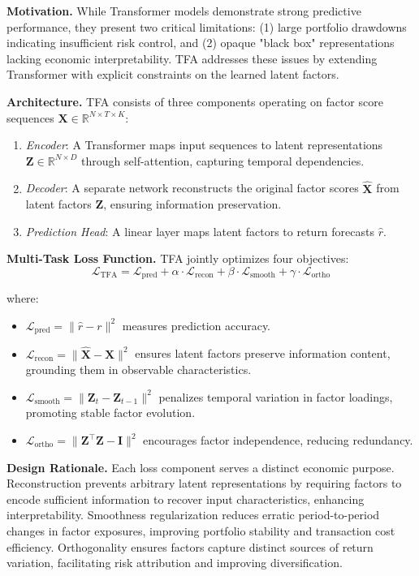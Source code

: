 \documentclass[12pt]{article}
\begin{document}
\textbf{Motivation.} While Transformer models demonstrate strong predictive performance, they present two critical limitations: (1) large portfolio drawdowns indicating insufficient risk control, and (2) opaque "black box" representations lacking economic interpretability. TFA addresses these issues by extending Transformer with explicit constraints on the learned latent factors.

\textbf{Architecture.} TFA consists of three components operating on factor score sequences $\mathbf{X} \in \mathbb{R}^{N \times T \times K}$:
\begin{enumerate}
    \item \textit{Encoder}: A Transformer maps input sequences to latent representations $\mathbf{Z} \in \mathbb{R}^{N \times D}$ through self-attention, capturing temporal dependencies.
    \item \textit{Decoder}: A separate network reconstructs the original factor scores $\hat{\mathbf{X}}$ from latent factors $\mathbf{Z}$, ensuring information preservation.
    \item \textit{Prediction Head}: A linear layer maps latent factors to return forecasts $\hat{r}$.
\end{enumerate}

\textbf{Multi-Task Loss Function.} TFA jointly optimizes four objectives:
\begin{equation}
\mathcal{L}_{\text{TFA}} = \mathcal{L}_{\text{pred}} + \alpha \cdot \mathcal{L}_{\text{recon}} + \beta \cdot \mathcal{L}_{\text{smooth}} + \gamma \cdot \mathcal{L}_{\text{ortho}}
\end{equation}

where:
\begin{itemize}
    \item $\mathcal{L}_{\text{pred}} = \|\hat{r} - r\|^2$ measures prediction accuracy.
    \item $\mathcal{L}_{\text{recon}} = \|\hat{\mathbf{X}} - \mathbf{X}\|^2$ ensures latent factors preserve information content, grounding them in observable characteristics.
    \item $\mathcal{L}_{\text{smooth}} = \|\mathbf{Z}_t - \mathbf{Z}_{t-1}\|^2$ penalizes temporal variation in factor loadings, promoting stable factor evolution.
    \item $\mathcal{L}_{\text{ortho}} = \|\mathbf{Z}^\top\mathbf{Z} - \mathbf{I}\|^2$ encourages factor independence, reducing redundancy.
\end{itemize}

\textbf{Design Rationale.} Each loss component serves a distinct economic purpose. Reconstruction prevents arbitrary latent representations by requiring factors to encode sufficient information to recover input characteristics, enhancing interpretability. Smoothness regularization reduces erratic period-to-period changes in factor exposures, improving portfolio stability and transaction cost efficiency. Orthogonality ensures factors capture distinct sources of return variation, facilitating risk attribution and improving diversification.
\end{document}
